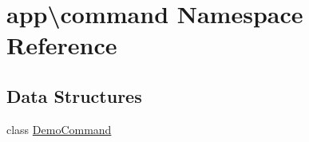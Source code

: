 \hypertarget{namespaceapp_1_1command}{\section{app\textbackslash{}command Namespace Reference}
\label{namespaceapp_1_1command}
}
\subsection*{Data Structures}
\begin{DoxyCompactItemize}
\item 
class \hyperlink{classapp_1_1command_1_1_demo_command}{Demo\-Command}
\end{DoxyCompactItemize}
